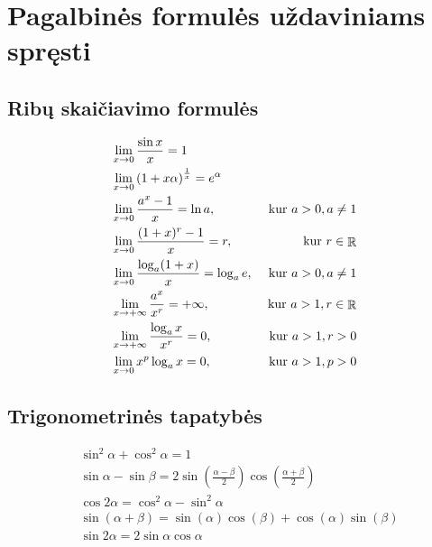 \appendix
\chapter{Pagalbinės formulės uždaviniams spręsti}

\section{Ribų skaičiavimo formulės}

\begin{align} 
%
  &\lim_{x \to 0} \frac{\sin x}{x} = 1
  \label{f_lim_sin} \\
%
  &\lim_{x \to 0} \left( 1 + x \alpha \right)^{\frac{1}{x}} = e^{\alpha}
  \label{f_lim_exp} \\
%
  &\lim_{x \to 0} \frac{a^x - 1}{x} = \ln a, 
  & \text{ kur } a > 0, a \neq 1
  \label{f_lim_ep} \\
% 
  &\lim_{x \to 0} \frac{(1 + x)^r -1}{x} = r, & \text{ kur } r \in \RSET
  \label{f_lim_lp} \\
%
  &\lim_{x \to 0} \frac{\log _{a} (1 + x)}{x} = \log _{a} e, 
  & \text{ kur } a > 0, a \neq 1
  \label{f_lim_log} \\
%
  &\lim_{x \to +\infty} \frac{a^x}{x^r} = +\infty, 
  & \text{ kur } a > 1, r \in \RSET
  \label{f_lim_rl} \\
% 
  &\lim_{x \to +\infty} \frac{\log _{a} x}{x^r} = 0,
  & \text{ kur } a > 1, r > 0
  \label{f_lim_llb} \\
%
  &\lim_{x \to 0} x^p \log _{a} x = 0, & \text{ kur } a > 1, p > 0
  \label{f_lim_lln}
%
\end{align}

\section{Trigonometrinės tapatybės}

\begin{align}
%
  & \sin ^{2} \alpha + \cos ^{2} \alpha = 1
  \label{f_tri_kvsum} \\
%
  & \sin \alpha - \sin \beta = 2 
    \sin \left( \frac{\alpha - \beta}{2} \right)
    \cos \left( \frac{\alpha + \beta}{2} \right)
  \label{f_tri_sinsk} \\
%
  & \cos 2 \alpha = \cos ^{2} \alpha - \sin ^{2} \alpha
  \label{f_tri_dkcos} \\
%
  & \sin (\alpha + \beta) = 
  \sin (\alpha) \cos (\beta) + \cos(\alpha) \sin(\beta) 
  \label{f_tri_sin} \\
  & \sin 2 \alpha = 2 \sin \alpha \cos \alpha
  \label{f_tri_dksin} 
%
\end{align}

